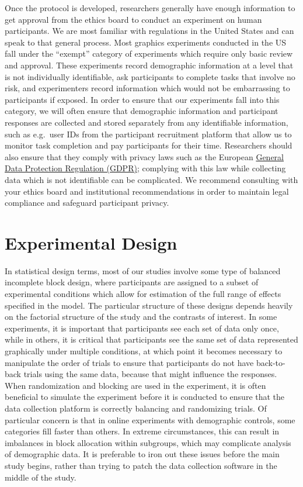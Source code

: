 \documentclass[
  10pt,
]{article}
\begin{document}
Once the protocol is developed, researchers generally have enough
information to get approval from the ethics board to conduct an
experiment on human participants. We are most familiar with regulations
in the United States and can speak to that general process. Most
graphics experiments conducted in the US fall under the ``exempt''
category of experiments which require only basic review and approval.
These experiments record demographic information at a level that is not
individually identifiable, ask participants to complete tasks that
involve no risk, and experimenters record information which would not be
embarrassing to participants if exposed. In order to ensure that our
experiments fall into this category, we will often ensure that
demographic information and participant responses are collected and
stored separately from any identifiable information, such as e.g.~user
IDs from the participant recruitment platform that allow us to monitor
task completion and pay participants for their time. Researchers should
also ensure that they comply with privacy laws such as the European
\href{https://gdpr-info.eu/chapter-3/}{General Data Protection
Regulation (GDPR)}; complying with this law while collecting data which
is not identifiable can be complicated. We recommend consulting with
your ethics board and institutional recommendations in order to maintain
legal compliance and safeguard participant privacy.

\section{Experimental Design}\label{sec-exp-design}

In statistical design terms, most of our studies involve some type of
balanced incomplete block design, where participants are assigned to a
subset of experimental conditions which allow for estimation of the full
range of effects specified in the model. The particular structure of
these designs depends heavily on the factorial structure of the study
and the contrasts of interest. In some experiments, it is important that
participants see each set of data only once, while in others, it is
critical that participants see the same set of data represented
graphically under multiple conditions, at which point it becomes
necessary to manipulate the order of trials to ensure that participants
do not have back-to-back trials using the same data, because that might
influence the responses. When randomization and blocking are used in the
experiment, it is often beneficial to simulate the experiment before it
is conducted to ensure that the data collection platform is correctly
balancing and randomizing trials. Of particular concern is that in
online experiments with demographic controls, some categories fill
faster than others. In extreme circumstances, this can result in
imbalances in block allocation within subgroups, which may complicate
analysis of demographic data. It is preferable to iron out these issues
before the main study begins, rather than trying to patch the data
collection software in the middle of the study.
\end{document}
